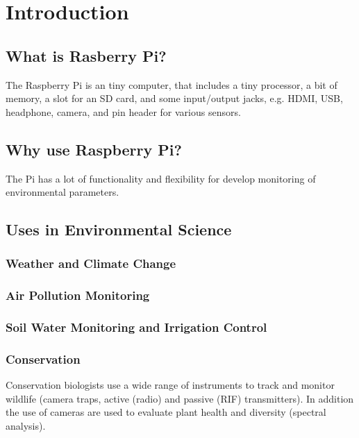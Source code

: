 \documentclass{article}\usepackage[]{graphicx}\usepackage[]{color}
\begin{document}
\section{Introduction}

\subsection{What is Rasberry Pi?}

The Raspberry Pi is an tiny computer, that includes a tiny processor, a bit of memory, a slot for an SD card, and some input/output jacks, e.g. HDMI, USB, headphone, camera, and pin header for various sensors.

\subsection{Why use Raspberry Pi?}

The Pi has a lot of functionality and flexibility for develop monitoring of environmental parameters. 

\subsection{Uses in Environmental Science}

\subsubsection{Weather and Climate Change}

\subsubsection{Air Pollution Monitoring}

\subsubsection{Soil Water Monitoring and Irrigation Control}


\subsubsection{Conservation} 

Conservation biologists use a wide range of instruments to track and monitor wildlife (camera traps, active (radio) and passive (RIF) transmitters). In addition the use of cameras are used to evaluate plant health and diversity (spectral analysis). 
\end{document}
